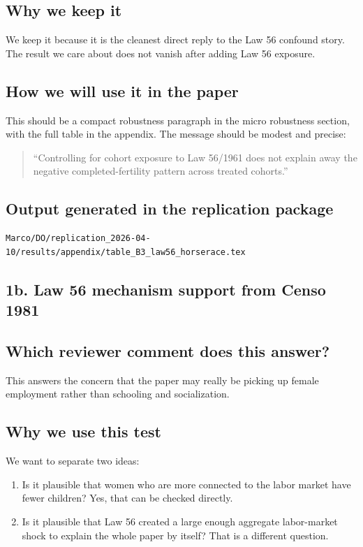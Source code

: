 \documentclass[11pt]{article}
\begin{document}
\subsection*{Why we keep it}

We keep it because it is the cleanest direct reply to the Law 56 confound story. The result we care about does not vanish after adding Law 56 exposure.

\subsection*{How we will use it in the paper}

This should be a compact robustness paragraph in the micro robustness section, with the full table in the appendix. The message should be modest and precise:

\begin{quote}
``Controlling for cohort exposure to Law 56/1961 does not explain away the negative completed-fertility pattern across treated cohorts.''
\end{quote}

\subsection*{Output generated in the replication package}

\begin{verbatim}
Marco/DO/replication_2026-04-10/results/appendix/table_B3_law56_horserace.tex
\end{verbatim}

\subsection*{1b. Law 56 mechanism support from Censo 1981}\label{sec:law56-1b}

\subsection*{Which reviewer comment does this answer?}

This answers the concern that the paper may really be picking up female employment rather than schooling and socialization.

\subsection*{Why we use this test}

We want to separate two ideas:
\begin{enumerate}[leftmargin=*]
\item Is it plausible that women who are more connected to the labor market have fewer children? Yes, that can be checked directly.
\item Is it plausible that Law 56 created a large enough aggregate labor-market shock to explain the whole paper by itself? That is a different question.
\end{enumerate}
\end{document}
